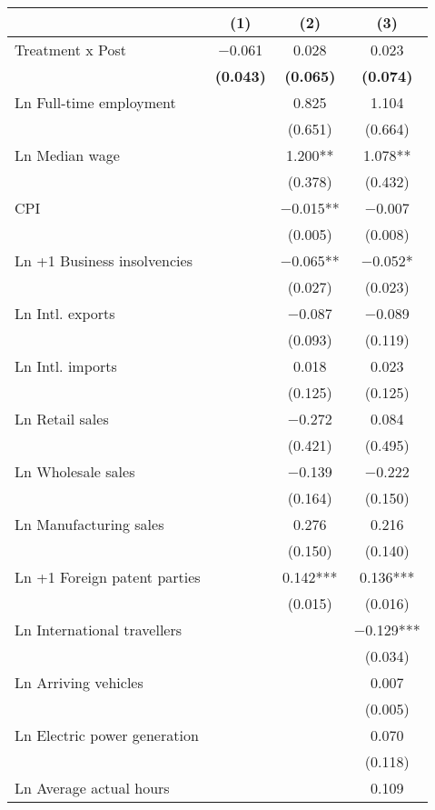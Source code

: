 
\begin{tabular}[t]{lccc}
\toprule
  & (1) & (2) & (3)\\
\midrule
Treatment x Post & \num{-0.061} & \num{0.028} & \num{0.023}\\
\textbf{} & \textbf{(\num{0.043})} & \textbf{(\num{0.065})} & \textbf{(\num{0.074})}\\
Ln Full-time employment &  & \num{0.825} & \num{1.104}\\
 &  & (\num{0.651}) & (\num{0.664})\\
Ln Median wage &  & \num{1.200}** & \num{1.078}**\\
 &  & (\num{0.378}) & (\num{0.432})\\
CPI &  & \num{-0.015}** & \num{-0.007}\\
 &  & (\num{0.005}) & (\num{0.008})\\
Ln +1 Business insolvencies &  & \num{-0.065}** & \num{-0.052}*\\
 &  & (\num{0.027}) & (\num{0.023})\\
Ln Intl. exports &  & \num{-0.087} & \num{-0.089}\\
 &  & (\num{0.093}) & (\num{0.119})\\
Ln Intl. imports &  & \num{0.018} & \num{0.023}\\
 &  & (\num{0.125}) & (\num{0.125})\\
Ln Retail sales &  & \num{-0.272} & \num{0.084}\\
 &  & (\num{0.421}) & (\num{0.495})\\
Ln Wholesale sales &  & \num{-0.139} & \num{-0.222}\\
 &  & (\num{0.164}) & (\num{0.150})\\
Ln Manufacturing sales &  & \num{0.276} & \num{0.216}\\
 &  & (\num{0.150}) & (\num{0.140})\\
Ln +1 Foreign patent parties &  & \num{0.142}*** & \num{0.136}***\\
 &  & (\num{0.015}) & (\num{0.016})\\
Ln International travellers &  &  & \num{-0.129}***\\
 &  &  & (\num{0.034})\\
Ln Arriving vehicles &  &  & \num{0.007}\\
 &  &  & (\num{0.005})\\
Ln Electric power generation &  &  & \num{0.070}\\
 &  &  & (\num{0.118})\\
Ln Average actual hours &  &  & \num{0.109}\\

\end{tabular}
